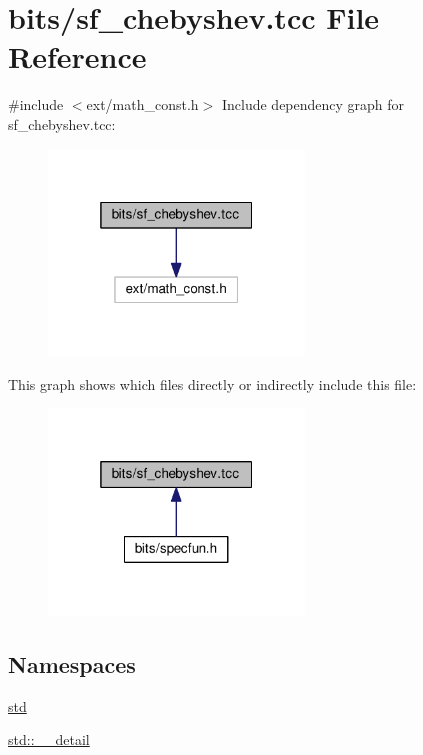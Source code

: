 \hypertarget{sf__chebyshev_8tcc}{}\section{bits/sf\+\_\+chebyshev.tcc File Reference}
\label{sf__chebyshev_8tcc}
{\ttfamily \#include $<$ext/math\+\_\+const.\+h$>$}\newline
Include dependency graph for sf\+\_\+chebyshev.\+tcc\+:
\nopagebreak
\begin{figure}[H]
\begin{center}
\leavevmode
\includegraphics[width=193pt]{sf__chebyshev_8tcc__incl}
\end{center}
\end{figure}
This graph shows which files directly or indirectly include this file\+:
\nopagebreak
\begin{figure}[H]
\begin{center}
\leavevmode
\includegraphics[width=193pt]{sf__chebyshev_8tcc__dep__incl}
\end{center}
\end{figure}
\subsection*{Namespaces}
\begin{DoxyCompactItemize}
\item 
 \hyperlink{namespacestd}{std}
\item 
 \hyperlink{namespacestd_1_1____detail}{std\+::\+\_\+\+\_\+detail}
\end{DoxyCompactItemize}
